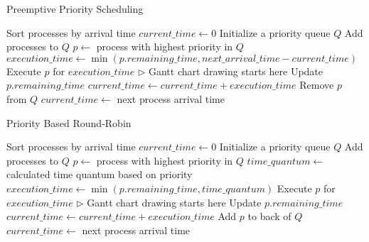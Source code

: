 \documentclass{article}
\begin{document}
\begin{algorithm}
\caption{Preemptive Priority Scheduling}
\begin{algorithmic}[1]
\State Sort processes by arrival time
\State $current\_time \gets 0$
\State Initialize a priority queue $Q$
        \State Add processes to $Q$
    \EndWhile
        \State $p \gets$ process with highest priority in $Q$
        \State $execution\_time \gets \min(p.remaining\_time, next\_arrival\_time - current\_time)$
        \State Execute $p$ for $execution\_time$ $\triangleright$ Gantt chart drawing starts here
        \State Update $p.remaining\_time$
        \State $current\_time \gets current\_time + execution\_time$
            \State Remove $p$ from $Q$
        \EndIf
    \Else
        \State $current\_time \gets$ next process arrival time
    \EndIf
\EndWhile
\end{algorithmic}
\end{algorithm}

\begin{algorithm}
\caption{Priority Based Round-Robin}
\begin{algorithmic}[1]
\State Sort processes by arrival time
\State $current\_time \gets 0$
\State Initialize a priority queue $Q$
        \State Add processes to $Q$
    \EndWhile
        \State $p \gets$ process with highest priority in $Q$
        \State $time\_quantum \gets$ calculated time quantum based on priority
        \State $execution\_time \gets \min(p.remaining\_time, time\_quantum)$
        \State Execute $p$ for $execution\_time$ $\triangleright$ Gantt chart drawing starts here
        \State Update $p.remaining\_time$
        \State $current\_time \gets current\_time + execution\_time$
            \State Add $p$ to back of $Q$
        \EndIf
    \Else
        \State $current\_time \gets$ next process arrival time
    \EndIf
\EndWhile
\end{algorithmic}
\end{algorithm}
\end{document}
